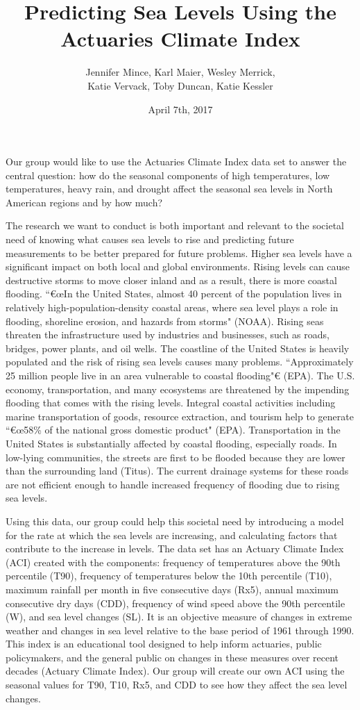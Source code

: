 \documentclass[12pt]{report}
\title{Predicting Sea Levels Using the Actuaries Climate Index}
\date{April 7th, 2017}
\author{Jennifer Mince, Karl Maier, Wesley Merrick,\\ Katie Vervack, Toby Duncan, Katie Kessler}
\begin{document}
	\maketitle

		\par Our group would like to use the Actuaries Climate Index data set to answer the central question: how do the seasonal components of high temperatures, low temperatures, heavy rain, and drought affect the seasonal sea levels in North American regions and by how much?
		\par The research we want to conduct is both important and relevant to the societal need of knowing what causes sea levels to rise and predicting future measurements to be better prepared for future problems. Higher sea levels have a significant impact on both local and global environments. Rising levels can cause destructive storms to move closer inland and as a result, there is more coastal flooding. \textquotedblleft€œIn the United States, almost 40 percent of the population lives in relatively high-population-density coastal areas, where sea level plays a role in flooding, shoreline erosion, and hazards from storms" (NOAA). Rising seas threaten the infrastructure used by industries and businesses, such as roads, bridges, power plants, and oil wells. The coastline of the United States is heavily populated and the risk of rising sea levels causes many problems. \textquotedblleft Approximately 25 million people live in an area vulnerable to coastal flooding"€ (EPA). The U.S. economy, transportation, and many ecosystems are threatened by the impending flooding that comes with the rising levels. Integral coastal activities including marine transportation of goods, resource extraction, and tourism help to generate \textquotedblleft€œ58\% of the national gross domestic product" (EPA). Transportation in the United States is substantially affected by coastal flooding, especially roads. In low-lying communities, the streets are first to be flooded because they are lower than the surrounding land (Titus). The current drainage systems for these roads are not efficient enough to handle increased frequency of flooding due to rising sea levels. 
		\par Using this data, our group could help this societal need by introducing a model for the rate at which the sea levels are increasing, and calculating factors that contribute to the increase in levels. The data set has an Actuary Climate Index (ACI) created with the components: frequency of temperatures above the 90th percentile (T90), frequency of temperatures below the 10th percentile (T10), maximum rainfall per month in five consecutive days (Rx5), annual maximum consecutive dry days (CDD), frequency of wind speed above the 90th percentile (W), and sea level changes (SL). It is an objective measure of changes in extreme weather and changes in sea level relative to the base period of 1961 through 1990. This index is an educational tool designed to help inform actuaries, public policymakers, and the general public on changes in these measures over recent decades (Actuary Climate Index). Our group will create our own ACI using the seasonal values for T90, T10, Rx5, and CDD to see how they affect the sea level changes. 
\end{document}
